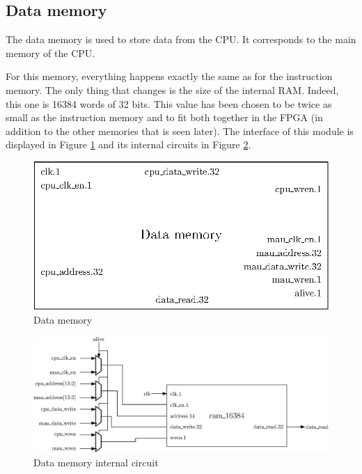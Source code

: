 \subsection{Data memory}

The data memory is used to store data from the CPU.  It corresponds to the main memory of the CPU.

For this memory, everything happens exactly the same as for the instruction memory. The only 
thing that changes is the size of the internal RAM. Indeed, this one is 16384 words of 32 bits. This 
value has been chosen to be twice as small as the instruction memory and to fit both together in 
the FPGA (in addition to the other memories that is seen later). The interface of this module
is displayed in Figure \ref{fig:components/dm} and its internal circuits in Figure \ref{fig:components/dm_in}.

\begin{figure}[H]
    \centering
    \includegraphics[scale=0.8]{Chapter3-CPU/res/data_memory}
    \caption{Data memory}
    \label{fig:components/dm}
\end{figure}

\begin{figure}[H]
    \centering
    \includegraphics[width=\linewidth]{Chapter3-CPU/res/data_memory_in}
    \caption{Data memory internal circuit}
    \label{fig:components/dm_in}
\end{figure}


